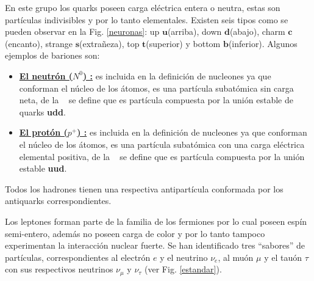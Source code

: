 En este grupo los quarks poseen carga eléctrica entera o neutra, estas son partículas indivisibles y por lo tanto elementales. Existen seis tipos como se pueden observar en la Fig. \ref{neuronas}: up $\mathbf{u}$(arriba), down $\mathbf{d}$(abajo), charm $\mathbf{c}$(encanto), strange $\mathbf{s}$(extrañeza), top $\mathbf{t}$(superior) y bottom $\mathbf{b}$(inferior). 
Algunos ejemplos de bariones son:
\begin{itemize}
    \item \href{https://es.wikipedia.org/wiki/Bari\%C3\%B3n_omega}{\textbf{El neutrón ($N^0$) :}} es incluida en la definición de nucleones ya que conforman el núcleo de los átomos, es una partícula subatómica sin carga neta,  de la \QCD ~ se define que es partícula compuesta por la unión estable de quarks \textbf{udd}.
    \item \href{https://es.wikipedia.org/wiki/Prot\%C3\%B3n}{\textbf{El protón ($p^+$) :}} es incluida en la definición de nucleones ya que conforman el núcleo de los átomos, es una partícula subatómica con una carga eléctrica elemental positiva, de la \QCD ~ se define que es partícula compuesta por la unión estable \textbf{uud}.
\end{itemize}

Todos los hadrones tienen una respectiva antipartícula conformada por los antiquarks correspondientes.


Los leptones forman parte de la familia de los fermiones por lo cual poseen espín semi-entero, además no poseen carga de color y por lo tanto tampoco experimentan la interacción nuclear fuerte. Se han identificado tres ``sabores'' de partículas, correspondientes al electrón $e$ y el neutrino $\nu_e$, al muón $\mu$ y el tauón $\tau$ con sus respectivos neutrinos $\nu_\mu$ y $\nu_\tau$ (ver Fig. \ref{estandar}).


